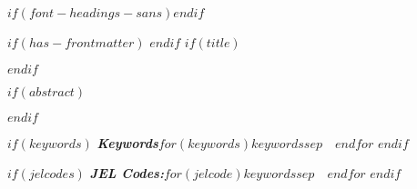$if(font-headings-sans)$\allsectionsfont{\sffamily}$endif$

$if(has-frontmatter)$
\frontmatter
$endif$
$if(title)$
\maketitle
$endif$

$if(abstract)$
\begin{abstract}
$abstract$
\end{abstract}
$endif$

$if(keywords)$
\textbf{\textit{Keywords}}\quad $for(keywords)$$keywords$$sep$~\textbullet~$endfor$
$endif$

$if(jelcodes)$
\textbf{\textit{JEL Codes:}}\quad $for(jelcode)$$keywords$$sep$~\textbullet~$endfor$
$endif$